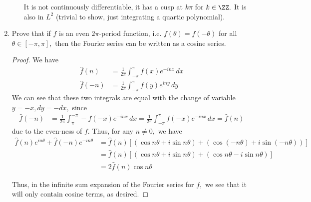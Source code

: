 \documentclass{article}
\begin{document}
\begin{enumerate}
\begin{enumerate}[(a)]
\begin{soln}
	  It is not continuously differentiable, it has a cusp at $k\pi$ for $k\in\ZZ.$ It is also in $L^2$ (trivial to show, just integrating a quartic polynomial).
	\end{soln}

    \end{enumerate}

  \item Prove that if $f$ is an even $2\pi$-period function, i.e. $f(\theta)=f(-\theta)$ for all $\theta\in[-\pi, \pi],$ then the Fourier series can be written as a cosine series. 
    \begin{proof}
      We have
      \begin{align*}
	\hat f(n) &= \frac{1}{2\pi}\int_{-\pi}^\pi f(x) e^{-inx}\, dx \\
	\hat f(-n) &= \frac{1}{2\pi}\int_{-\pi}^\pi f(y) e^{iny}\, dy
      \end{align*}
      We can see that these two integrals are equal with the change of variable $y=-x, dy=-dx,$ since
      \begin{align*}
	\hat f(-n) &= \frac{1}{2\pi} \int_{\pi}^{-\pi} -f(-x) e^{-inx}\, dx = \frac{1}{2\pi} \int_{-\pi}^\pi f(-x) e^{-inx}\, dx = \hat f(n)
      \end{align*}
      due to the even-ness of $f.$ Thus, for any $n\neq 0,$ we have
      \begin{align*}
	\hat f(n)e^{in\theta} + \hat f(-n) e^{-in\theta} &= \hat f(n) \left[ \left( \cos n\theta + i\sin n\theta \right) + \left( \cos (-n\theta) + i\sin (-n\theta) \right) \right] \\
	&= \hat f(n) \left[ \left( \cos n\theta + i\sin n\theta \right) + \left( \cos n\theta - i\sin n\theta \right) \right] \\
	&= 2\hat f(n) \cos n\theta
      \end{align*}

      Thus, in the infinite sum expansion of the Fourier series for $f,$ we see that it will only contain cosine terms, as desired. 
    \end{proof}

\end{enumerate}
\end{document}
